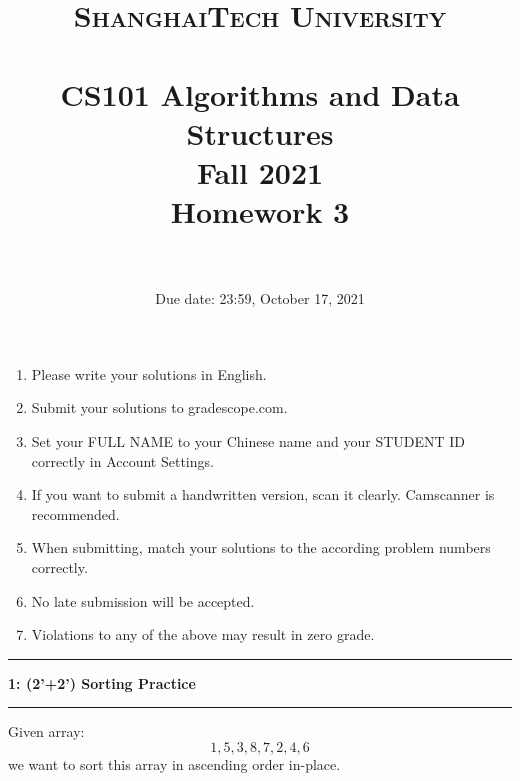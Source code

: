 \documentclass[10.5pt]{article}
\title{
	\normalfont \normalsize
	\textsc{ShanghaiTech University} \\ [25pt]
	\horrule{0.5pt} \\[0.4cm] %
	\huge CS101 Algorithms and Data Structures\\ %
	\LARGE Fall 2021\\
	\LARGE Homework 3\\
	\horrule{2pt} \\[0.5cm] %
}
\author{}
\date{Due date: 23:59, October 17, 2021}
\newcommand\question[2]{\vspace{.25in}\hrule\textbf{#1: #2}\vspace{.5em}\hrule\vspace{.10in}}
\begin{document}
	
	\maketitle
	\thispagestyle{firstpage}
	\vspace{3ex}
	
	\begin{enumerate}
		\item Please write your solutions in English. 
		
		\item Submit your solutions to gradescope.com.  
		
		\item Set your FULL NAME to your Chinese name and your STUDENT ID correctly in Account Settings. 
		
		\item If you want to submit a handwritten version, scan it clearly. Camscanner is recommended. 
		
		\item When submitting, match your solutions to the according problem numbers correctly. 
		
		\item No late submission will be accepted.
		
		\item Violations to any of the above may result in zero grade. 
	\end{enumerate}
	\newpage

\question{1}{(2'+2') Sorting Practice}
Given array:
$$1,   5,   3,   8,   7,   2,   4,   6$$
we want to sort this array in ascending order in-place.
\end{document}

